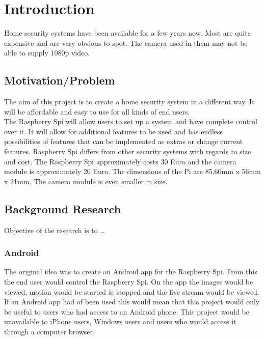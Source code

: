 \documentclass[]{report}
\begin{document}
\tableofcontents
\chapter {Introduction}
\label {ch:intro} 

Home security systems have been available for a few years now. Most are quite expensive and are very obvious to spot. The camera used in them may not be able to supply 1080p video.

\section {Motivation/Problem}
\label {sec:motprob}
The aim of this project is to create a home security system in a different way. It will be affordable and easy to use for all kinds of end users.\\

The Raspberry Spi will allow users to set up a system and have complete control over it. It will allow for additional features to be used and has endless possibilities of features that can be implemented as extras or change current features. 
Raspberry Spi differs from other security systems with regards to size and cost. The Raspberry Spi approximately costs 30 Euro and the camera module is approximately 20 Euro. The dimensions of the Pi are 85.60mm x 56mm x 21mm. The camera module is even smaller in size.
% 
\section {Background Research}
\label {sec:research}
Objective of the research is to \ldots

\subsection {Android}
\label {subsec:Android}
The original idea was to create an Android app for the Raspberry Spi. From this the end user would control the Raspberry Spi. On the app the images would be viewed, motion would be started \& stopped and the live stream would be viewed.\\

If an Android app had of been used this would mean that this project would only be useful to users who had access to an Android phone. This project would be unavailable to iPhone users, Windows users and users who would access it through a computer browser.
\end{document}
